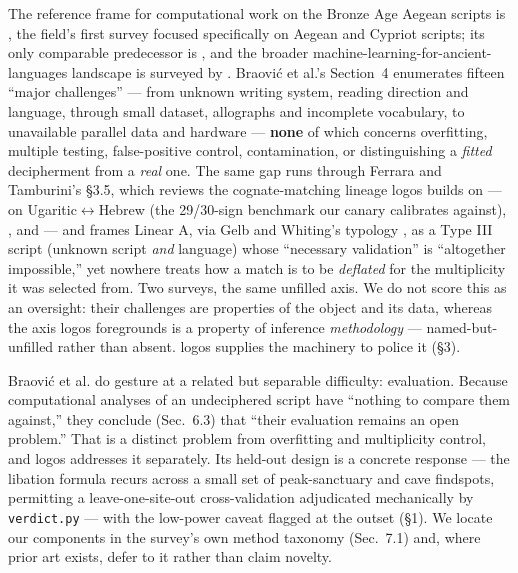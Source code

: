 The reference frame for computational work on the Bronze Age Aegean
scripts is \citet[\emph{Computational Linguistics}
50(2):725--779]{braovic2024}, the field's first survey focused
specifically on Aegean and Cypriot scripts; its only comparable
predecessor is \citet{ferrara2022}, and the broader
machine-learning-for-ancient-languages landscape is surveyed by
\citet[\emph{Computational Linguistics} 49(3)]{sommerschield2023}.
Braovi\'{c} et al.'s Section~4 enumerates fifteen ``major challenges'' ---
from unknown writing system, reading direction and language, through
small dataset, allographs and incomplete vocabulary, to unavailable
parallel data and hardware --- \textbf{none} of which concerns
overfitting, multiple testing, false-positive control, contamination, or
distinguishing a \emph{fitted} decipherment from a \emph{real} one. The
same gap runs through Ferrara and Tamburini's
\citeyearpar[\emph{Lingue e Linguaggio} XXI.2:239--259]{ferrara2022}
\S3.5, which reviews the cognate-matching lineage logos builds on ---
\citet{snyder2010} on Ugaritic$\leftrightarrow$Hebrew (the 29/30-sign
benchmark our canary calibrates against), \citet{bergkirkpatrick2011},
and \citet{luo2019, luo2021} --- and frames Linear A, via Gelb and
Whiting's typology \citep{gelb1975}, as a Type III script (unknown script
\emph{and} language) whose ``necessary validation'' is ``altogether
impossible,'' yet nowhere treats how a match is to be \emph{deflated} for
the multiplicity it was selected from. Two surveys, the same unfilled
axis. We do not score this as an oversight: their challenges are
properties of the object and its data, whereas the axis logos foregrounds
is a property of inference \emph{methodology} --- named-but-unfilled
rather than absent. logos supplies the machinery to police it (\S3).

Braovi\'{c} et al. do gesture at a related but separable difficulty:
evaluation. Because computational analyses of an undeciphered script have
``nothing to compare them against,'' they conclude (Sec.~6.3) that
``their evaluation remains an open problem.'' That is a distinct problem
from overfitting and multiplicity control, and logos addresses it
separately. Its held-out design is a concrete response --- the libation
formula recurs across a small set of peak-sanctuary and cave findspots,
permitting a leave-one-site-out cross-validation adjudicated mechanically
by \texttt{verdict.py} --- with the low-power caveat flagged at the
outset (\S1). We locate our components in the survey's own
method taxonomy (Sec.~7.1) and, where prior art exists, defer to it
rather than claim novelty.

